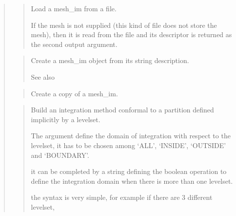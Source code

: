 \documentclass[a4paper,11pt,english]{sphinxmanual}
\begin{document}
\sphinxAtStartPar
{}
\begin{quote}

\sphinxAtStartPar
{}
\begin{quote}

\sphinxAtStartPar
Load a mesh\_im from a file.

\sphinxAtStartPar
If the mesh  is not supplied (this kind of file does not store the
mesh), then it is read from the file and its descriptor is returned as
the second output argument.
\end{quote}

\sphinxAtStartPar
{}
\begin{quote}

\sphinxAtStartPar
Create a mesh\_im object from its string description.

\sphinxAtStartPar
See also 
\end{quote}

\sphinxAtStartPar
{}
\begin{quote}

\sphinxAtStartPar
Create a copy of a mesh\_im.
\end{quote}

\sphinxAtStartPar
{}
\begin{quote}

\sphinxAtStartPar
Build an integration method conformal to a partition defined
implicitly by a levelset.

\sphinxAtStartPar
The  argument define the domain of integration with respect to
the levelset, it has to be chosen among ‘ALL’, ‘INSIDE’, ‘OUTSIDE’ and
‘BOUNDARY’.

\sphinxAtStartPar
it can be completed by a string defining the boolean operation
to define the integration domain when there is more than one levelset.

\sphinxAtStartPar
the syntax is very simple, for example if there are 3 different
levelset,
\begin{quote}


\end{quote}
\end{quote}
\end{quote}
\end{document}
